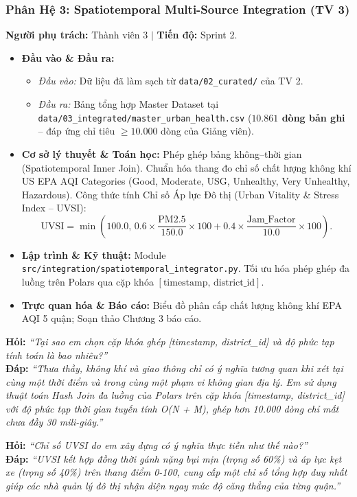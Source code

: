 \documentclass[11pt,a4paper]{article}
\begin{document}
\subsubsection{Phân Hệ 3: Spatiotemporal Multi-Source Integration (TV 3)}
\textbf{Người phụ trách:} Thành viên 3 \quad $\vert$ \quad \textbf{Tiến độ:} Sprint 2.
\begin{itemize}[leftmargin=*]
    \item \textbf{Đầu vào \& Đầu ra:}
    \begin{itemize}
        \item \textit{Đầu vào:} Dữ liệu đã làm sạch từ \texttt{data/02\_curated/} của TV 2.
        \item \textit{Đầu ra:} Bảng tổng hợp Master Dataset tại \texttt{data/03\_integrated/master\_urban\_health.csv} (\textbf{$10.861$ dòng bản ghi} -- đáp ứng chỉ tiêu $\ge 10.000$ dòng của Giảng viên).
    \end{itemize}
    \item \textbf{Cơ sở lý thuyết \& Toán học:}
    Phép ghép bảng không--thời gian (Spatiotemporal Inner Join). Chuẩn hóa thang đo chỉ số chất lượng không khí US EPA AQI Categories (Good, Moderate, USG, Unhealthy, Very Unhealthy, Hazardous). Công thức tính Chỉ số Áp lực Đô thị (Urban Vitality \& Stress Index -- UVSI):
    \begin{equation}
        \text{UVSI} = \min\left(100.0, \, 0.6 \times \frac{\text{PM2.5}}{150.0} \times 100 + 0.4 \times \frac{\text{Jam\_Factor}}{10.0} \times 100\right).
    \end{equation}
    \item \textbf{Lập trình \& Kỹ thuật:} Module \texttt{src/integration/spatiotemporal\_integrator.py}. Tối ưu hóa phép ghép đa luồng trên Polars qua cặp khóa $[\text{timestamp}, \, \text{district\_id}]$.
    \item \textbf{Trực quan hóa \& Báo cáo:} Biểu đồ phân cấp chất lượng không khí EPA AQI 5 quận; Soạn thảo Chương 3 báo cáo.
\end{itemize}

\begin{tcolorbox}[colback=blue!5!white, colframe=blue!60!black, fonttitle=\bfseries\color{white}, title={BỘ CÂU HỎI VẤN ĐÁP TRỌNG TÂM DÀNH CHO TV 3}]
\textbf{Hỏi:} \textit{“Tại sao em chọn cặp khóa ghép [timestamp, district\_id] và độ phức tạp tính toán là bao nhiêu?”}\\
\textbf{Đáp:} \textit{“Thưa thầy, không khí và giao thông chỉ có ý nghĩa tương quan khi xét tại cùng một thời điểm và trong cùng một phạm vi không gian địa lý. Em sử dụng thuật toán Hash Join đa luồng của Polars trên cặp khóa [timestamp, district\_id] với độ phức tạp thời gian tuyến tính O(N + M), ghép hơn 10.000 dòng chỉ mất chưa đầy 30 mili-giây.”}

\textbf{Hỏi:} \textit{“Chỉ số UVSI do em xây dựng có ý nghĩa thực tiễn như thế nào?”}\\
\textbf{Đáp:} \textit{“UVSI kết hợp đồng thời gánh nặng bụi mịn (trọng số 60\%) và áp lực kẹt xe (trọng số 40\%) trên thang điểm 0-100, cung cấp một chỉ số tổng hợp duy nhất giúp các nhà quản lý đô thị nhận diện ngay mức độ căng thẳng của từng quận.”}
\end{tcolorbox}
\end{document}
